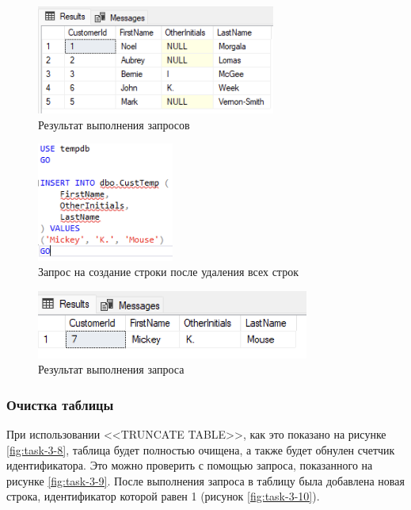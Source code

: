 \documentclass[a4paper, 14pt]{extarticle}
\begin{document}
\begin{figure}[H]
  \centering
  \includegraphics[width=0.7\textwidth]{images/task-3/5.png}
  \caption{Результат выполнения запросов}
  \label{fig:task-3-5}
\end{figure}

\begin{figure}[H]
  \centering
  \includegraphics[width=0.4\textwidth]{images/task-3/6.png}
  \caption{Запрос на создание строки после удаления всех строк}
  \label{fig:task-3-6}
\end{figure}

\begin{figure}[H]
  \centering
  \includegraphics[width=0.8\textwidth]{images/task-3/7.png}
  \caption{Результат выполнения запроса}
  \label{fig:task-3-7}
\end{figure}

\subsubsection{Очистка таблицы}

При использовании <<\foreignlanguage{english}{TRUNCATE TABLE}>>, как это
показано на рисунке \ref{fig:task-3-8}, таблица будет полностью очищена, а также
будет обнулен счетчик идентификатора. Это можно проверить с помощью запроса,
показанного на рисунке \ref{fig:task-3-9}. После выполнения запроса в таблицу
была добавлена новая строка, идентификатор которой равен 1 (рисунок
\ref{fig:task-3-10}).
\end{document}
